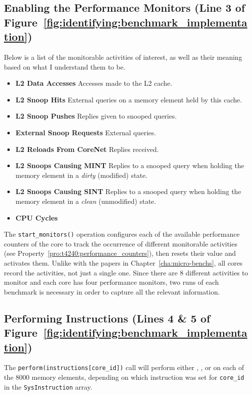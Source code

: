 \subsection{Enabling the Performance Monitors (Line 3 of Figure~\ref{fig:identifying:benchmark_implementation})}
\label{sec:identifying:perf_monitors}
\begin{property}
\label{pro:t4240:performance_counters}
Below is a list of the monitorable activities of interest, as well as their
meaning based on what I understand them to be.
\begin{itemize}
\item \textbf{L2 Data Accesses} Accesses made to the L2 cache.
\item \textbf{L2 Snoop Hits}
   External queries on a memory element held by this cache.
\item \textbf{L2 Snoop Pushes} Replies given to snooped queries.
\item \textbf{External Snoop Requests} External queries.
\item \textbf{L2 Reloads From CoreNet} Replies received.
\item \textbf{L2 Snoops Causing MINT}
   Replies to a snooped query when holding the memory element in a
   \textit{dirty} (modified) state.
\item \textbf{L2 Snoops Causing SINT}
   Replies to a snooped query when holding the memory element in a
   \textit{clean} (unmodified) state.
\item \textbf{CPU Cycles}
\end{itemize}
\end{property}

The \lstinline!start_monitors()! operation configures each of the available
performance counters of the core to track the occurrence of different
monitorable
activities
(see Property~\ref{pro:t4240:performance_counters}), then resets their value and
activates them. Unlike with the papers in Chapter~\ref{cha:micro-benchs}, all
cores record the activities, not just a single one. Since there are 8 different
activities to monitor and each core has four performance monitors, two runs of
each benchmark is necessary in order to capture all the relevant information.

\subsection{Performing Instructions (Lines 4 \& 5 of
Figure~\ref{fig:identifying:benchmark_implementation})}
\label{sec:identifying:performing_instructions}
The \lstinline!perform(instructions[core_id])! call will perform either
\loadinstr{}, \storeinstr{}, or \evictinstr{} on each of the 8000 memory
elements, depending on which instruction was set for \lstinline!core_id! in the
\lstinline!SysInstruction! array.

